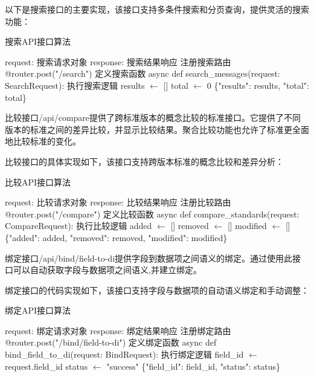 以下是搜索接口的主要实现，该接口支持多条件搜索和分页查询，提供灵活的搜索功能：

\begin{algorithm}[H]
\caption{搜索API接口算法}
\begin{algorithmic}[1]
\REQUIRE request: 搜索请求对象
\ENSURE response: 搜索结果响应
\STATE 注册搜索路由
\STATE @router.post("/search")
\STATE 定义搜索函数
\STATE async def search\_messages(request: SearchRequest):
\STATE     执行搜索逻辑
\STATE     results $\leftarrow$ []
\STATE     total $\leftarrow$ 0
\STATE     \RETURN \{"results": results, "total": total\}
\end{algorithmic}
\end{algorithm}

比较接口/api/compare提供了跨标准版本的概念比较的标准接口。它提供了不同版本的标准之间的差异比较，并显示比较结果。聚合比较功能也允许了标准更全面地比较标准的变化。

比较接口的具体实现如下，该接口支持跨版本标准的概念比较和差异分析：

\begin{algorithm}[H]
\caption{比较API接口算法}
\begin{algorithmic}[1]
\REQUIRE request: 比较请求对象
\ENSURE response: 比较结果响应
\STATE 注册比较路由
\STATE @router.post("/compare")
\STATE 定义比较函数
\STATE async def compare\_standards(request: CompareRequest):
\STATE     执行比较逻辑
\STATE     added $\leftarrow$ []
\STATE     removed $\leftarrow$ []
\STATE     modified $\leftarrow$ []
\STATE     \RETURN \{"added": added, "removed": removed, "modified": modified\}
\end{algorithmic}
\end{algorithm}

绑定接口/api/bind/field-to-di提供字段到数据项之间语义的绑定。通过使用此接口可以自动获取字段与数据项之间语义,并建立绑定。

绑定接口的代码实现如下，该接口支持字段与数据项的自动语义绑定和手动调整：

\begin{algorithm}[H]
\caption{绑定API接口算法}
\begin{algorithmic}[1]
\REQUIRE request: 绑定请求对象
\ENSURE response: 绑定结果响应
\STATE 注册绑定路由
\STATE @router.post("/bind/field-to-di")
\STATE 定义绑定函数
\STATE async def bind\_field\_to\_di(request: BindRequest):
\STATE     执行绑定逻辑
\STATE     field\_id $\leftarrow$ request.field\_id
\STATE     status $\leftarrow$ "success"
\STATE     \RETURN \{"field\_id": field\_id, "status": status\}
\end{algorithmic}
\end{algorithm}

